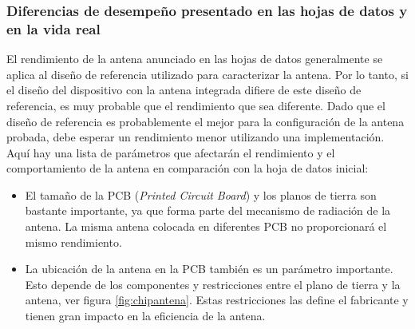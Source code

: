\subsubsection{Diferencias de desempeño presentado en las hojas de datos y en la vida real}
El rendimiento de la antena anunciado en las hojas de datos generalmente se aplica al diseño de referencia utilizado para caracterizar la antena. Por lo tanto, si el diseño del dispositivo con la antena integrada difiere de este diseño de referencia, es muy probable que el rendimiento que sea diferente. Dado que el diseño de referencia es probablemente el mejor para la configuración de la antena probada, debe esperar un rendimiento menor utilizando una implementación. Aquí hay una lista de parámetros que afectarán el rendimiento y el comportamiento de la antena en comparación con la hoja de datos inicial:

\begin{itemize}
    \item El tamaño de la PCB (\textit{Printed Circuit Board}) y los planos de tierra son bastante importante, ya que forma parte del mecanismo de radiación de la antena. La misma antena colocada en diferentes PCB no proporcionará el mismo rendimiento.
    \item La ubicación de la antena en la PCB también es un parámetro importante. Esto depende de los componentes y restricciones entre el plano de tierra y la antena, ver figura \ref{fig:chipantena}. Estas restricciones las define el fabricante y tienen gran impacto en la eficiencia de la antena.

\end{itemize}

